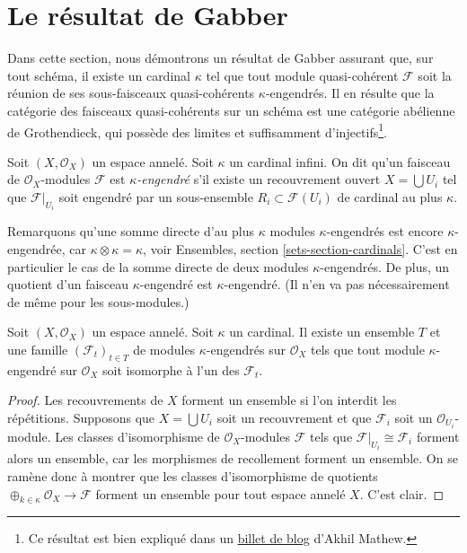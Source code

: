 \section{Le résultat de Gabber}
\label{section-gabber}

\noindent
Dans cette section, nous démontrons un résultat de Gabber assurant que, sur tout
schéma, il existe un cardinal $\kappa$ tel que tout module quasi-cohérent
$\mathcal{F}$ soit la réunion de ses sous-faisceaux quasi-cohérents
$\kappa$-engendrés. Il en résulte que la catégorie des faisceaux quasi-cohérents
sur un schéma est une catégorie abélienne de Grothendieck, qui possède
des limites et suffisamment d'injectifs\footnote{Ce résultat est bien expliqué dans un
\href{https://amathew.wordpress.com/2011/07/30/quasi-coherent-sheaves-presentable-categories-and-a-result-of-gabber/}{billet de blog}
d'Akhil Mathew.}.

\begin{definition}
\label{definition-kappa-generated}
Soit $(X, \mathcal{O}_X)$ un espace annelé. Soit $\kappa$ un cardinal
infini. On dit qu'un faisceau de $\mathcal{O}_X$-modules $\mathcal{F}$ est
{\it $\kappa$-engendré} s'il existe un recouvrement ouvert
$X = \bigcup U_i$ tel que $\mathcal{F}|_{U_i}$ soit engendré par
un sous-ensemble $R_i \subset \mathcal{F}(U_i)$ de cardinal
au plus $\kappa$.
\end{definition}

\noindent
Remarquons qu'une somme directe d'au plus $\kappa$ modules $\kappa$-engendrés est
encore $\kappa$-engendrée, car $\kappa \otimes \kappa = \kappa$, voir
Ensembles, section \ref{sets-section-cardinals}.
C'est en particulier le cas de la somme directe de deux modules $\kappa$-engendrés.
De plus, un quotient d'un faisceau $\kappa$-engendré est $\kappa$-engendré.
(Il n'en va pas nécessairement de même pour les sous-modules.)

\begin{lemma}
\label{lemma-set-of-iso-classes}
Soit $(X, \mathcal{O}_X)$ un espace annelé. Soit $\kappa$ un cardinal.
Il existe un ensemble $T$ et une famille $(\mathcal{F}_t)_{t \in T}$ de modules
$\kappa$-engendrés sur $\mathcal{O}_X$ tels que tout module $\kappa$-engendré
sur $\mathcal{O}_X$ soit isomorphe à l'un des $\mathcal{F}_t$.
\end{lemma}

\begin{proof}
Les recouvrements de $X$ forment un ensemble si l'on interdit les répétitions.
Supposons que $X = \bigcup U_i$ soit un recouvrement et que $\mathcal{F}_i$
soit un $\mathcal{O}_{U_i}$-module. Les classes d'isomorphisme
de $\mathcal{O}_X$-modules $\mathcal{F}$ tels que
$\mathcal{F}|_{U_i} \cong \mathcal{F}_i$ forment alors un ensemble, car les morphismes
de recollement forment un ensemble. On se ramène donc à montrer que les classes
d'isomorphisme de quotients
$\oplus_{k \in \kappa} \mathcal{O}_X \to \mathcal{F}$
forment un ensemble pour tout espace annelé $X$. C'est clair.
\end{proof}

